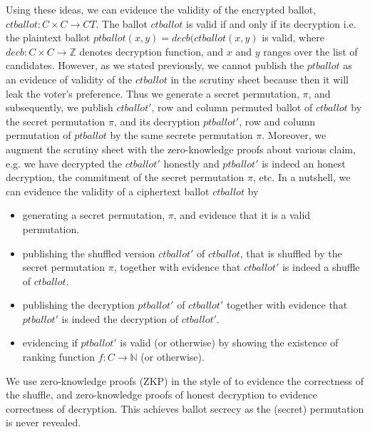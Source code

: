 Using these 
ideas, we can evidence the validity of the encrypted ballot,  $ctballot : C \times C \to CT$. 
The ballot $ctballot$ is valid if and only if its decryption  i.e. the plaintext ballot 
$ptballot (x, y) = decb(ctballot (x, y)$ is valid, where $decb : C \times C \to \mathbb{Z}$ 
denotes decryption function, and $x$ and $y$ ranges over the list of candidates. 
However,  as we stated previously, we cannot publish the $ptballot$ as an evidence of validity of 
the $ctballot$ in the scrutiny sheet because then it will leak the 
voter's preference. Thus we generate a secret permutation, $\pi$,  and  subsequently, 
we publish $ctballot'$,  row and column permuted ballot 
of $ctballot$ by the secret permutation $\pi$,  and its decryption $ptballot'$, 
row and column permutation of $ptballot$ by the same secrete permutation $\pi$. 
Moreover,  we augment the scrutiny sheet with the zero-knowledge proofs about various claim, 
e.g. we have decrypted the $ctballot'$ honestly and $ptballot'$ is indeed an honest 
decryption,  the commitment of the secret permutation $\pi$,  etc.  
In a nutshell, we can evidence the validity
of a ciphertext ballot $ctballot$ by
\begin{itemize}
  \item generating a secret permutation, $\pi$, and evidence that it is a valid permutation.
  \item publishing the shuffled version $ctballot'$ of $ctballot$, that is
  shuffled by the secret permutation $\pi$, together with
  evidence that $ctballot'$ is indeed a shuffle of $ctballot$.
  \item publishing the decryption $ptballot'$ of $ctballot'$ together with
  evidence that $ptballot'$ is indeed the decryption of $ctballot'$.
  \item evidencing if $ptballot'$ is valid (or otherwise) by showing the 
  existence of ranking function $f : C \to \mathbb{N}$ (or otherwise).
\end{itemize}

\noindent
We use zero-knowledge proofs (ZKP) in the style of \citep{DBLP:conf/africacrypt/TereliusW10}
to evidence the correctness of the shuffle, and zero-knowledge
proofs of honest decryption \citep{DBLP:conf/crypto/ChaumP92} to evidence
correctness of decryption. This achieves ballot secrecy as
the (secret) permutation is never revealed.


